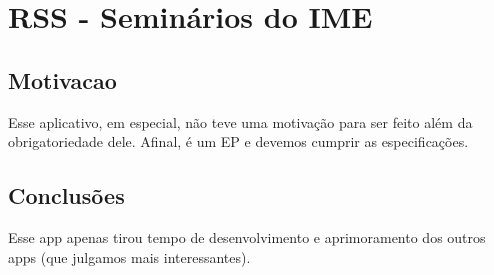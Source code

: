 \section{RSS - Seminários do IME}

\subsection{Motivacao}
Esse aplicativo, em especial, não teve uma motivação para ser feito além
da obrigatoriedade dele. Afinal, é um EP e devemos cumprir as
especificações.

\subsection{Conclusões}
Esse app apenas tirou tempo de desenvolvimento e aprimoramento dos outros
apps (que julgamos mais interessantes).



